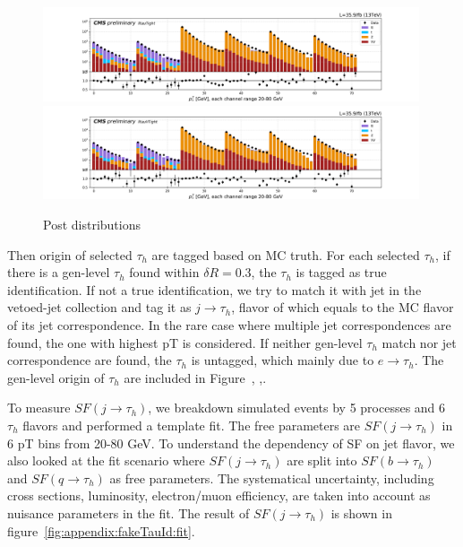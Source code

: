 \begin{figure}
    \centering
    \includegraphics[width=0.99\textwidth]{chapters/Appendix/sectionJetToTauh/figures/2020_tauID_postfit_lltauTight.png}
    \includegraphics[width=0.99\textwidth]{chapters/Appendix/sectionJetToTauh/figures/2020_tauID_postfit_lltauVTight.png}
    \caption{Post distributions}
    \label{fig:appendix:fakeTauId:postfit}
\end{figure}

Then origin of selected $\tau_h$ are tagged based on MC truth.  For each
selected $\tau_h$, if there is a gen-level $\tau_h$ found within $\delta
R = 0.3$, the $\tau_h$ is tagged as true identification.  If not a true
identification, we try to match it with jet in the vetoed-jet collection
and tag it as $j \to \tau_h$, flavor of which equals to the MC flavor of
its jet correspondence.  In the rare case where multiple jet
correspondences are found, the one with highest pT is considered.  If
neither gen-level $\tau_h$ match nor jet correspondence are found, the
$\tau_h$ is untagged, which mainly due to $e \to \tau_h$. The gen-level 
origin of $\tau_h$ are included in Figure~\label{fig:appendix:fakeTauId:emutau},
\label{fig:appendix:fakeTauId:mumutau},\label{fig:appendix:fakeTauId:eetau}.


To measure $SF (j \to \tau_h)$, we breakdown simulated events by 5
processes and 6 $\tau_h$ flavors and performed a template fit.  The free
parameters are $SF (j \to \tau_h)$ in 6 pT bins from 20-80 GeV. To
understand the dependency of SF on jet flavor, we also looked at the fit
scenario where $SF (j \to \tau_h)$ are split into $SF (b \to \tau_h)$
and $SF (q \to \tau_h)$ as free parameters.  The systematical
uncertainty, including cross sections, luminosity, electron/muon
efficiency, are taken into account as nuisance parameters in the fit.
The result of $SF (j\to \tau_h)$ is shown in figure~\ref{fig:appendix:fakeTauId:fit}. 




